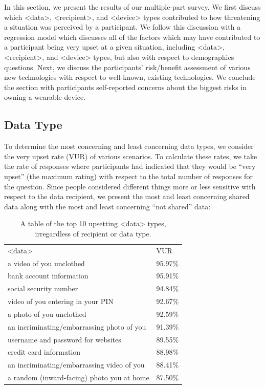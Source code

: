\documentclass{acm_proc_article-sp}
\begin{document}
In this section, we present the results of our multiple-part survey. We first discuss which <data>, <recipient>, and <device> types contributed to how threatening a situation was perceived by a participant. We follow this discussion with a regression model which discusses all of the factors which may have contributed to a participant being very upset at a given situation, including <data>, <recipient>, and <device> types, but also with respect to demographics questions. Next, we discuss the participants' risk/benefit assessment of various new technologies with respect to well-known, existing technologies. We conclude the section with participants self-reported concerns about the biggest risks in owning a wearable device.  

\subsection{Data Type}
To determine the most concerning and least concerning data types, we consider the very upset rate (VUR) of various scenarios. To calculate these rates, we take the rate of responses where participants had indicated that they would be ``very upset'' (the maximum rating) with respect to the total number of responses for the question. Since people considered different things more or less sensitive with respect to the data recipient, we present the most and least concerning shared data along with the most and least concerning ``not shared'' data:

\begin{table}%
\begin{center}
\begin{tabular}{ll}

<data> &  VUR  \\
a video of you unclothed & 95.97\% \\
bank account information & 95.91\% \\
social security number & 94.84\% \\
video of you entering in your PIN & 92.67\% \\
a photo of you unclothed & 92.59\% \\
an incriminating/embarrassing photo of you & 91.39\% \\
username and password for websites & 89.55\% \\
credit card information & 88.98\% \\
an incriminating/embarrassing video of you & 88.41\% \\
a random (inward-facing) photo you at home & 87.50\% \\

\end{tabular}
\caption{A table of the top 10 upsetting <data> types, irregardless of recipient or data type.}
\label{top10}
\end{center}
\end{table}
\end{document}
